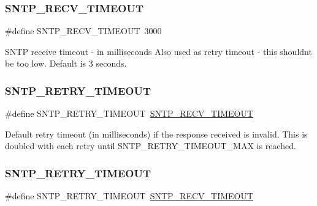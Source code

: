 \subsubsection{\texorpdfstring{S\+N\+T\+P\+\_\+\+R\+E\+C\+V\+\_\+\+T\+I\+M\+E\+O\+UT}{SNTP\_RECV\_TIMEOUT}\hspace{0.1cm}{\footnotesize\ttfamily [2/2]}}
{\footnotesize\ttfamily \#define S\+N\+T\+P\+\_\+\+R\+E\+C\+V\+\_\+\+T\+I\+M\+E\+O\+UT~3000}

S\+N\+TP receive timeout -\/ in milliseconds Also used as retry timeout -\/ this shouldn\textquotesingle{}t be too low. Default is 3 seconds. \mbox{\label{group__sntp__opts_ga86d651d8eb07687208308deef95a23ba}} 
\subsubsection{\texorpdfstring{S\+N\+T\+P\+\_\+\+R\+E\+T\+R\+Y\+\_\+\+T\+I\+M\+E\+O\+UT}{SNTP\_RETRY\_TIMEOUT}\hspace{0.1cm}{\footnotesize\ttfamily [1/2]}}
{\footnotesize\ttfamily \#define S\+N\+T\+P\+\_\+\+R\+E\+T\+R\+Y\+\_\+\+T\+I\+M\+E\+O\+UT~\hyperlink{group__sntp__opts_ga44cf26b9b19832d88599244711a12d08}{S\+N\+T\+P\+\_\+\+R\+E\+C\+V\+\_\+\+T\+I\+M\+E\+O\+UT}}

Default retry timeout (in milliseconds) if the response received is invalid. This is doubled with each retry until S\+N\+T\+P\+\_\+\+R\+E\+T\+R\+Y\+\_\+\+T\+I\+M\+E\+O\+U\+T\+\_\+\+M\+AX is reached. \mbox{\label{group__sntp__opts_ga86d651d8eb07687208308deef95a23ba}} 
\subsubsection{\texorpdfstring{S\+N\+T\+P\+\_\+\+R\+E\+T\+R\+Y\+\_\+\+T\+I\+M\+E\+O\+UT}{SNTP\_RETRY\_TIMEOUT}\hspace{0.1cm}{\footnotesize\ttfamily [2/2]}}
{\footnotesize\ttfamily \#define S\+N\+T\+P\+\_\+\+R\+E\+T\+R\+Y\+\_\+\+T\+I\+M\+E\+O\+UT~\hyperlink{group__sntp__opts_ga44cf26b9b19832d88599244711a12d08}{S\+N\+T\+P\+\_\+\+R\+E\+C\+V\+\_\+\+T\+I\+M\+E\+O\+UT}}

